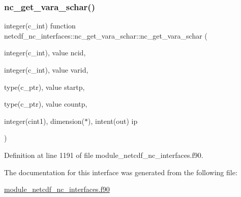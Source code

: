 \subsubsection{\texorpdfstring{nc\+\_\+get\+\_\+vara\+\_\+schar()}{nc\_get\_vara\_schar()}}
{\footnotesize\ttfamily integer(c\+\_\+int) function netcdf\+\_\+nc\+\_\+interfaces\+::nc\+\_\+get\+\_\+vara\+\_\+schar\+::nc\+\_\+get\+\_\+vara\+\_\+schar (\begin{DoxyParamCaption}\item[{integer(c\+\_\+int), value}]{ncid,  }\item[{integer(c\+\_\+int), value}]{varid,  }\item[{type(c\+\_\+ptr), value}]{startp,  }\item[{type(c\+\_\+ptr), value}]{countp,  }\item[{integer(cint1), dimension($\ast$), intent(out)}]{ip }\end{DoxyParamCaption})}



Definition at line 1191 of file module\+\_\+netcdf\+\_\+nc\+\_\+interfaces.\+f90.



The documentation for this interface was generated from the following file\+:\begin{DoxyCompactItemize}
\item 
\hyperlink{module__netcdf__nc__interfaces_8f90}{module\+\_\+netcdf\+\_\+nc\+\_\+interfaces.\+f90}\end{DoxyCompactItemize}
